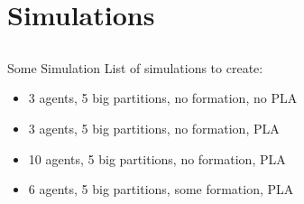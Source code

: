 \documentclass[t]{beamer}
\begin{document}

\section[Simulations]{Simulations}
\subsection[Some Simulation]{}
\begin{frame}[label=sl3]{Some Simulation}
List of simulations to create:
\begin{itemize}
\item 3 agents, 5 big partitions, no formation, no PLA
\item 3 agents, 5 big partitions, no formation, PLA
\item 10 agents, 5 big partitions, no formation, PLA
\item 6 agents, 5 big partitions, some formation, PLA
\end{itemize}
\end{frame}
\end{document}
